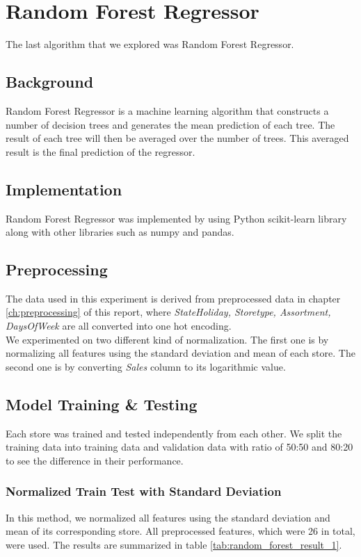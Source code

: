 \section{Random Forest Regressor} \label{sec:rf}
The last algorithm that we explored was Random Forest Regressor.

\subsection{Background}
Random Forest Regressor is a machine learning algorithm that constructs a number of decision trees and generates the mean prediction of each tree. The result of each tree will then be averaged over the number of trees. This averaged result is the final prediction of the regressor. 

\subsection{Implementation}
Random Forest Regressor was implemented by using Python scikit-learn library along with other libraries such as numpy and pandas.

\subsection{Preprocessing}
The data used in this experiment is derived from preprocessed data in chapter \ref{ch:preprocessing} of this report, where \textit{StateHoliday, Storetype, Assortment, DaysOfWeek} are all converted into one hot encoding.\\
We experimented on two different kind of normalization. The first one is by normalizing all features using the standard deviation and mean of each store. The second one is by converting \textit{Sales} column to its logarithmic value.  

\subsection{Model Training \& Testing}
Each store was trained and tested independently from each other. We split the training data into training data and validation data with ratio of 50:50 and 80:20 to see the difference in their performance. 

\subsubsection{Normalized Train Test with Standard Deviation}
In this method, we normalized all features using the standard deviation and mean of its corresponding store. All preprocessed features, which were 26 in total, were used. The results are summarized in table \ref{tab:random_forest_result_1}.

